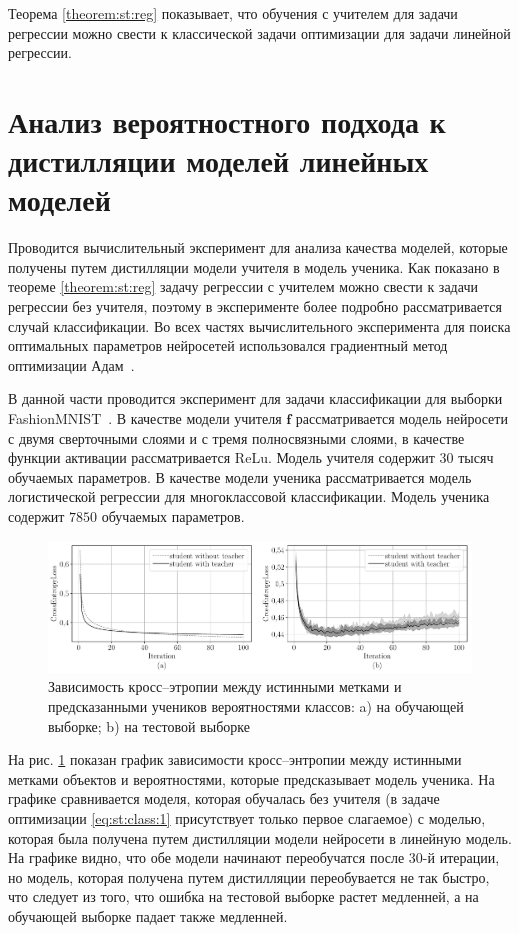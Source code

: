 Теорема \ref{theorem:st:reg} показывает, что обучения с учителем для задачи регрессии можно свести к классической задачи оптимизации для задачи линейной регрессии.

\section{Анализ вероятностного подхода к дистилляции моделей линейных моделей}
Проводится вычислительный эксперимент для анализа качества моделей, которые получены путем дистилляции модели учителя в модель ученика. Как показано в теореме \ref{theorem:st:reg} задачу регрессии с учителем можно свести к задачи регрессии без учителя, поэтому в эксперименте более подробно рассматривается случай классификации. Во всех частях вычислительного эксперимента для поиска оптимальных параметров нейросетей использовался градиентный метод оптимизации Адам~\cite{kingma2014}.

В данной части проводится эксперимент для задачи классификации для выборки FashionMNIST~\cite{fashionmnist}. В качестве модели учителя $\mathbf{f}$ рассматривается модель нейросети с двумя сверточными слоями и с тремя полносвязными слоями, в качестве функции активации рассматривается ReLu. Модель учителя содержит $ 30$ тысяч обучаемых параметров. В качестве модели ученика рассматривается модель логистической регрессии для многоклассовой классификации. Модель ученика содержит $7850$ обучаемых параметров.

\begin{figure}[h!t]\center
\includegraphics[width=1\textwidth]{results/privlearn/mnist_loss}
\caption{Зависимость кросс--этропии между истинными метками и предсказанными учеников вероятностями классов: a) на обучающей выборке; b) на тестовой выборке}
\label{fg:ex:fashionmnist:loss}
\end{figure}

На рис. \ref{fg:ex:fashionmnist:loss} показан график зависимости кросс--энтропии между истинными метками объектов и вероятностями, которые предсказывает модель ученика. На графике сравнивается моделя, которая обучалась без учителя (в задаче оптимизации \eqref{eq:st:class:1} присутствует только первое слагаемое) с моделью, которая была получена путем дистилляции модели нейросети в линейную модель. На графике видно, что обе модели начинают переобучатся после 30-й итерации, но модель, которая получена путем дистилляции переобувается не так быстро, что следует из того, что ошибка на тестовой выборке растет медленней, а на обучающей выборке падает также медленней.


